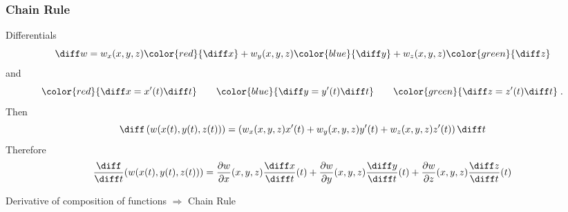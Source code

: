 \begin{frame}
  \frametitle{Chain Rule}
Differentials
%
\[
\diff w=w_x(x,y,z){\color{red}{\diff x}} +
w_y(x,y,z){\color{blue}{\diff y}}+
w_z(x,y,z){\color{green}{\diff z}}
\]
%
and
%
\[
{\color{red}{\diff x=x'(t)\diff t}} \qquad
{\color{blue}{\diff y = y'(t)\diff t}} \qquad
{\color{green}{\diff z=z'(t)\diff t}} \; .
\]
%
\pause Then
%
\[
\diff \left(w(x(t), y(t), z(t)) \right)= \left( w_x(x,y,z) x'(t) + w_y(x,y,z) y'(t) +
w_z(x,y,z) z'(t) \right) \diff t
\]
%
\pause
Therefore
%
\[
\frac{\diff }{\diff t}(w(x(t), y(t), z(t))) = \frac{\partial w}{\partial x}(x,y,z) \frac{\diff x}{\diff t}(t) +
\frac{\partial w}{\partial y}(x,y,z) \frac{\diff y}{\diff t}(t) +
\frac{\partial w}{\partial z}(x,y,z) \frac{\diff z}{\diff t}(t)
\]

\pause
Derivative of composition of functions $\Longrightarrow$ \alert<1->{Chain Rule}
\end{frame}